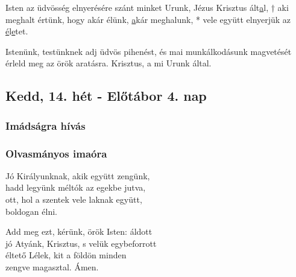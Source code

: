 \documentclass[twoside]{article}
\begin{document}
Isten az üdvösség elnyerésére szánt minket Urunk, Jézus Krisztus ált\underline{a}l, † aki meghalt
értünk, hogy akár élünk, \underline{a}kár meghalunk, * vele együtt elnyerjük az
\underline{é}l\underline{e}tet.

Istenünk, testünknek adj üdvös pihenést, és mai munkálkodásunk magvetését érleld meg az örök
aratásra. Krisztus, a mi Urunk által.

\subsection*{Kedd, 14. hét - Előtábor 4. nap}

\subsubsection*{Imádságra hívás}

\label{f3/Inv}



\subsubsection*{Olvasmányos imaóra}



Jó Királyunknak, akik együtt zengünk,\\
hadd legyünk méltók az egekbe jutva,\\
ott, hol a szentek vele laknak együtt,\\
boldogan élni.

Add meg ezt, kérünk, örök Isten: áldott\\
jó Atyánk, Krisztus, s velük egybeforrott\\
éltető Lélek, kit a földön minden\\
zengve magasztal. Ámen.



\end{document}
